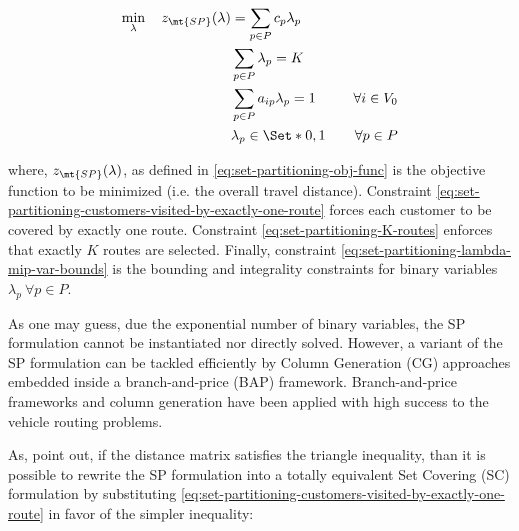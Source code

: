 \begin{align}
	\min_{\lambda} \quad z_\mt{SP}(\lambda) & = \sum_{p \in P}  c_p \lambda_p \label{eq:set-partitioning-obj-func}                                                                                                                                           \\
	                                        & \sum_{p \in P} \lambda_{p} = K\label{eq:set-partitioning-K-routes}                                                                                                                                             \\
	                                        & \sum_{p \in P}  a_{ip} \lambda_p = 1                                 & \quad \forall i \in V_0                                              \label{eq:set-partitioning-customers-visited-by-exactly-one-route} \\
	                                        & \lambda_p                    \in \Set*{0, 1}                         & \quad \forall p \in P \label{eq:set-partitioning-lambda-mip-var-bounds}
\end{align}

where, $z_\mt{SP}(\lambda)$, as defined in \eqref{eq:set-partitioning-obj-func} is the objective function to be minimized (i.e. the overall travel distance).
Constraint \eqref{eq:set-partitioning-customers-visited-by-exactly-one-route} forces each customer to be covered by exactly one route.
Constraint \eqref{eq:set-partitioning-K-routes} enforces that exactly $K$ routes are selected.
Finally, constraint \eqref{eq:set-partitioning-lambda-mip-var-bounds} is the bounding and integrality constraints for binary variables $\lambda_p \ \forall p \in P$.

As one may guess,
due the exponential number of binary variables,
the SP formulation cannot be instantiated nor directly solved.
However,
a variant of the SP formulation can be tackled efficiently by Column Generation (CG) approaches
embedded inside a branch-and-price (BAP) framework.
Branch-and-price frameworks and column generation have been applied
with high success to the vehicle routing problems.


As, \textcite{toth2002} point out, if the distance matrix satisfies the triangle inequality,
than it is possible to rewrite the SP formulation into a totally equivalent Set Covering (SC) formulation
by substituting \cref{eq:set-partitioning-customers-visited-by-exactly-one-route} in favor of the simpler inequality:

